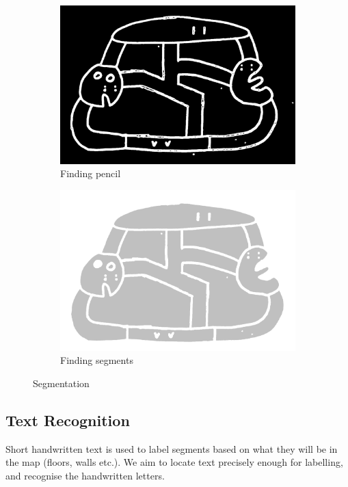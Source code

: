 \documentclass[11pt]{IEEEtran}
\begin{document}
\begin{figure}[h]
     \centering
     \begin{subfigure}[b]{0.24\textwidth}
         \centering
         \includegraphics[width=\textwidth]{s1}
         \caption{Finding pencil}
         \label{fig:s1}
     \end{subfigure}
     \hfill
     \begin{subfigure}[b]{0.24\textwidth}
         \centering
         \includegraphics[width=\textwidth]{s2}
         \caption{Finding segments}
         \label{fig:s2}
     \end{subfigure}
        \caption{Segmentation}
        \label{fig:seg}
\end{figure}

\subsection{Text Recognition}
Short handwritten text is used to label segments based on what they will be in the map (floors, walls etc.). We aim to locate text precisely enough for labelling, and recognise the handwritten letters. 
\end{document}
